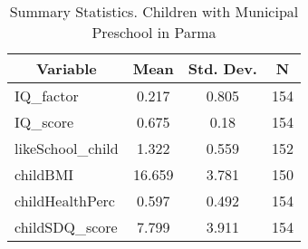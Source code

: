 
\begin{table}[htbp]\centering \caption{Summary Statistics. Children with Municipal Preschool in Parma \label{bothChildmaternaMuniParma}}
\begin{tabular}{l c c  c}\hline\hline
\multicolumn{1}{c}{\textbf{Variable}} & \textbf{Mean}
 & \textbf{Std. Dev.} & \textbf{N}\\ \hline
IQ\_factor & 0.217 & 0.805  & 154\\
IQ\_score & 0.675 & 0.18  & 154\\
likeSchool\_child & 1.322 & 0.559  & 152\\
childBMI & 16.659 & 3.781  & 150\\
childHealthPerc & 0.597 & 0.492  & 154\\
childSDQ\_score & 7.799 & 3.911  & 154\\
\hline\end{tabular}
\end{table}

